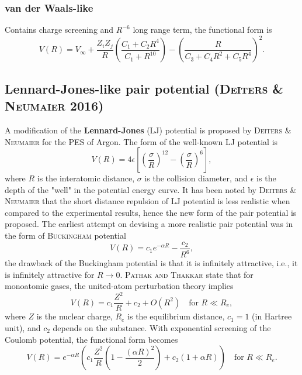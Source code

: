 \documentclass[12pt]{article}
\begin{document}
\subsubsection{van der Waals-like}
Contains charge screening and $R^{-6}$ long range term, the functional form is
\begin{equation}
    V(R) = V_{\infty} + \frac{Z_iZ_j}{R}
    \left(\frac{C_1+C_2R^4}{C_1+R^{10}}\right) - \left(\frac{R}{C_3+C_4R^2+C_5R^4}\right)^2.
\end{equation}
\fi
\subsection{Lennard-Jones-like pair potential (\textsc{Deiters \& Neumaier} 2016)}
A modification of the \textbf{Lennard-Jones} (LJ) potential \cite{ljpot} is proposed by \textsc{Deiters \& Neumaier} \cite{idx178} for the PES of Argon. The form of the well-known LJ potential is
\begin{equation}
    V(R) = 4\epsilon\left[\left(\frac{\sigma}{R}\right)^{12} - \left(\frac{\sigma}{R}\right)^{6} \right],
    \label{eq:lj}
\end{equation}
where $R$ is the interatomic distance, $\sigma$ is the collision diameter, and $\epsilon$ is the depth of the "well" in the potential energy curve. It has been noted by \textsc{Deiters \& Neumaier} \cite{idx178} that the short distance repulsion of LJ potential is less realistic when compared to the experimental results, hence the new form of the pair potential is proposed. The earliest attempt on devising a more realistic pair potential was in the form of \textsc{Buckingham} \cite{buckingham} potential
\begin{equation}
    V(R) = c_1e^{-\alpha R} - \frac{c_2}{R^6},
    \label{eq:buckingham}
\end{equation}
the drawback of the Buckingham potential is that it is infinitely attractive, i.e., it is infinitely attractive for $R \rightarrow 0$. \textsc{Pathak and Thakkar} \cite{pathak} state that for monoatomic gases, the united-atom perturbation theory implies
\begin{equation}
    V(R) = c_1\frac{Z^2}{R} + c_2 + O(R^2) \quad \text{for }R \ll R_e,
    \label{eq:pathak}
\end{equation}
where $Z$ is the nuclear charge, $R_e$ is the equilibrium distance, $c_1 = 1$ (in Hartree unit), and $c_2$ depends on the substance. With exponential screening of the Coulomb potential, the functional form becomes
\begin{equation}
    V(R) = e^{-\alpha R}
    \left( c_1 \frac{Z^2}{R} 
    \left( 1 - \frac{(\alpha R)^2}{2} \right)
    + c_2(1+ \alpha R)\right) \quad \text{for }R \ll R_e.
    \label{eq:chargescreening}
\end{equation}
\end{document}

